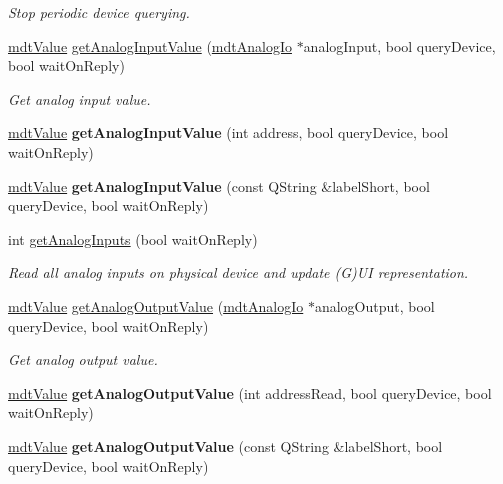 \begin{DoxyCompactItemize}
\begin{DoxyCompactList}\small\item\em Stop periodic device querying. \end{DoxyCompactList}\item 
\hyperlink{classmdt_value}{mdtValue} \hyperlink{classmdt_device_ab828764660ba53ffce1995901ddf5a0a}{getAnalogInputValue} (\hyperlink{classmdt_analog_io}{mdtAnalogIo} $\ast$analogInput, bool queryDevice, bool waitOnReply)
\begin{DoxyCompactList}\small\item\em Get analog input value. \end{DoxyCompactList}\item 
\hypertarget{classmdt_device_ad6a9d73cd51ce21f69dc8e4646d4fcfe}{
\hyperlink{classmdt_value}{mdtValue} {\bfseries getAnalogInputValue} (int address, bool queryDevice, bool waitOnReply)}
\label{classmdt_device_ad6a9d73cd51ce21f69dc8e4646d4fcfe}

\item 
\hypertarget{classmdt_device_a66a4c466dd6cb5c8235850f6dc23ae7b}{
\hyperlink{classmdt_value}{mdtValue} {\bfseries getAnalogInputValue} (const QString \&labelShort, bool queryDevice, bool waitOnReply)}
\label{classmdt_device_a66a4c466dd6cb5c8235850f6dc23ae7b}

\item 
int \hyperlink{classmdt_device_a98cba3132db15317daf54eb701388e91}{getAnalogInputs} (bool waitOnReply)
\begin{DoxyCompactList}\small\item\em Read all analog inputs on physical device and update (G)UI representation. \end{DoxyCompactList}\item 
\hyperlink{classmdt_value}{mdtValue} \hyperlink{classmdt_device_a163ee286d905feafe50b3e4351d4bf41}{getAnalogOutputValue} (\hyperlink{classmdt_analog_io}{mdtAnalogIo} $\ast$analogOutput, bool queryDevice, bool waitOnReply)
\begin{DoxyCompactList}\small\item\em Get analog output value. \end{DoxyCompactList}\item 
\hypertarget{classmdt_device_aa90eb1111d6778f4227224d3b1804ae7}{
\hyperlink{classmdt_value}{mdtValue} {\bfseries getAnalogOutputValue} (int addressRead, bool queryDevice, bool waitOnReply)}
\label{classmdt_device_aa90eb1111d6778f4227224d3b1804ae7}

\item 
\hypertarget{classmdt_device_ad6bfbab4c93bc0136068e773dd776010}{
\hyperlink{classmdt_value}{mdtValue} {\bfseries getAnalogOutputValue} (const QString \&labelShort, bool queryDevice, bool waitOnReply)}
\label{classmdt_device_ad6bfbab4c93bc0136068e773dd776010}


\end{DoxyCompactItemize}

